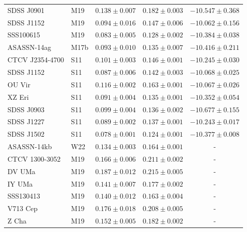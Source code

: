 \begin{table}
\begin{tabular}{llccc}
        SDSS J0901          &  M19      & $0.138 \pm 0.007$ & $0.182 \pm 0.003$ & $-10.547 \pm 0.368$ \\
        SDSS J1152          &  M19      & $0.094 \pm 0.016$ & $0.147 \pm 0.006$ & $-10.062 \pm 0.156$ \\
        SSS100615           &  M19      & $0.083 \pm 0.005$ & $0.128 \pm 0.002$ & $-10.384 \pm 0.038$ \\
        ASASSN-14ag         &  M17b     & $0.093 \pm 0.010$ & $0.135 \pm 0.007$ & $-10.416 \pm 0.211$ \\
        CTCV J2354-4700     &  S11      & $0.101 \pm 0.003$ & $0.146 \pm 0.001$ & $-10.245 \pm 0.030$ \\
        SDSS J1152          &  S11      & $0.087 \pm 0.006$ & $0.142 \pm 0.003$ & $-10.068 \pm 0.025$ \\
        OU Vir              &  S11      & $0.116 \pm 0.002$ & $0.163 \pm 0.001$ & $-10.067 \pm 0.026$ \\
        XZ Eri              &  S11      & $0.091 \pm 0.004$ & $0.135 \pm 0.001$ & $-10.352 \pm 0.054$ \\
        SDSS J0903          &  S11      & $0.099 \pm 0.004$ & $0.136 \pm 0.002$ & $-10.677 \pm 0.155$ \\
        SDSS J1227          &  S11      & $0.089 \pm 0.002$ & $0.137 \pm 0.001$ & $-10.243 \pm 0.017$ \\
        SDSS J1502          &  S11      & $0.078 \pm 0.001$ & $0.124 \pm 0.001$ & $-10.377 \pm 0.008$ \\
        ASASSN-14kb         &  W22      & $0.134 \pm 0.003$ & $0.164 \pm 0.001$ & -                   \\
        CTCV 1300-3052      &  M19      & $0.166 \pm 0.006$ & $0.211 \pm 0.002$ & -                   \\
        DV UMa              &  M19      & $0.187 \pm 0.012$ & $0.215 \pm 0.005$ & -                   \\
        IY UMa              &  M19      & $0.141 \pm 0.007$ & $0.177 \pm 0.002$ & -                   \\
        SSS130413           &  M19      & $0.140 \pm 0.012$ & $0.163 \pm 0.004$ & -                   \\
        V713 Cep            &  M19      & $0.176 \pm 0.018$ & $0.208 \pm 0.005$ & -                   \\
        Z Cha               &  M19      & $0.152 \pm 0.005$ & $0.182 \pm 0.002$ & -                   \\

\end{tabular}
\end{table}
